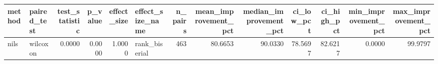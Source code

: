 \begin{tabular}{llrrrlrrrrrrr}
\toprule
method & paired_test & test_statistic & p_value & effect_size & effect_size_name & n_pairs & mean_improvement_pct & median_improvement_pct & ci_low_pct & ci_high_pct & min_improvement_pct & max_improvement_pct \\
\midrule
nils & wilcoxon & 0.0000 & 0.0000 & 1.0000 & rank_biserial & 463 & 80.6653 & 90.0330 & 78.5697 & 82.6217 & 0.0000 & 99.9797 \\
\bottomrule
\end{tabular}
